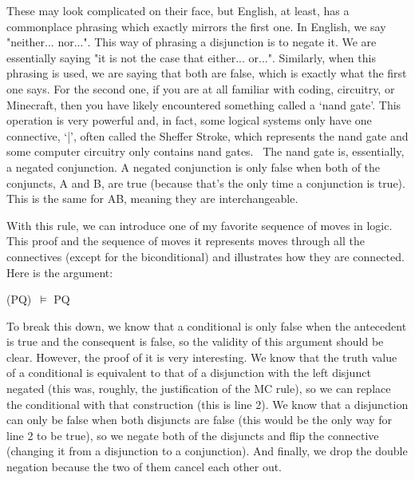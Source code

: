 These may look complicated on their face, but English, at least, has a commonplace phrasing which exactly mirrors the first one. In English, we say "neither... nor...". This way of phrasing a disjunction is to negate it. We are essentially saying "it is not the case that either... or...". Similarly, when this phrasing is used, we are saying that both are false, which is exactly what the first one says. For the second one, if you are at all familiar with coding, circuitry, or Minecraft, then you have likely encountered something called a `nand gate'. This operation is very powerful and, in fact, some logical systems only have one connective, `|', often called the Sheffer Stroke, which represents the nand gate and some computer circuitry only contains nand gates.  The nand gate is, essentially, a negated conjunction. A negated conjunction is only false when both of the conjuncts, A and B, are true (because that's the only time a conjunction is true). This is the same for \enot A\eor \enot B, meaning they are interchangeable. 

With this rule, we can introduce one of my favorite sequence of moves in logic. This proof and the sequence of moves it represents moves through all the connectives (except for the biconditional) and illustrates how they are connected. Here is the argument:
\begin{center}
\enot (P\eif Q) $\vDash$ P\eand \enot Q
\end{center}
\begin{fitchproof}
 	
\end{fitchproof}
To break this down, we know that a conditional is only false when the antecedent is true and the consequent is false, so the validity of this argument should be clear. However, the proof of it is very interesting. We know that the truth value of a conditional is equivalent to that of a disjunction with the left disjunct negated (this was, roughly, the justification of the MC rule), so we can replace the conditional with that construction (this is line 2). We know that a disjunction can only be false when both disjuncts are false (this would be the only way for line 2 to be true), so we negate both of the disjuncts and flip the connective (changing it from a disjunction to a conjunction). And finally, we drop the double negation because the two of them cancel each other out.

